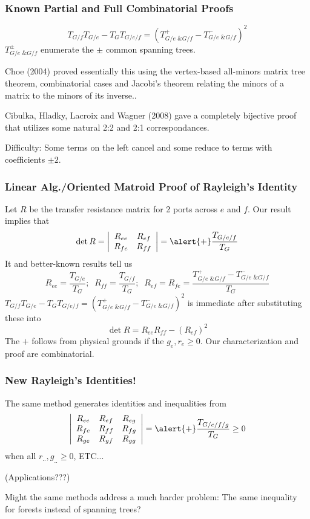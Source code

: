 \documentclass{article}
\newcommand{\Remph}[1]{{\color{red}#1}}
\begin{document}
\begin{frame}
\frametitle{Known Partial and Full Combinatorial Proofs}
\[
T_{G/f}T_{G/e} - T_GT_{G/e/f} = \left( T^+_{G/e \text{ \& } G/f} - T^-_{G/e \text{ \& } G/f} \right)^2
\]
$T^{\pm}_{G/e \text{ \& } G/f}$ enumerate the $\pm$ common spanning trees.

\vfill
Choe (2004) 
proved essentially this using the vertex-based all-minors matrix tree theorem,
combinatorial cases and Jacobi's theorem relating the minors of a matrix to
the minors of its inverse..

\vfill
Cibulka, Hladky, Lacroix and Wagner (2008) gave a completely bijective proof
that utilizes some natural 2:2 and 2:1 correspondances.

\vfill
\Remph{Difficulty:} Some terms on the left \Remph{cancel} and some
reduce to terms with coefficients $\pm 2$.
\vfill
\end{frame}



\begin{frame}
\frametitle{Linear Alg./Oriented Matroid Proof of Rayleigh's Identity}
Let $R$ be the transfer resistance matrix for 2 ports across $e$ and $f$.
Our result implies that
\[
\det R = \left|\begin{array}{cc} R_{ee} & R_{ef} \\ R_{fe} & R_{ff} \end{array}\right|
= \alert{+} \frac{T_{G/e/f}}{T_G}
\]
It and better-known results tell us
\[
R_{ee} = \frac{T_{G/e}}{T_G};\;\;R_{ff} = \frac{T_{G/f}}{T_G};\;\;
R_{ef}=R_{fe}=\frac{ T^+_{G/e \text{ \& } G/f} - T^-_{G/e \text{ \& } G/f} }{T_G}
\]
$T_{G/f}T_{G/e} - T_GT_{G/e/f} = \left( T^+_{G/e \text{ \& } G/f} - T^-_{G/e \text{ \& } G/f} \right)^2$
is immediate after substituting these into
\[
\det R = R_{ee}R_{ff}-(R_{ef})^2
\]
\alert{The $+$ follows from physical grounds if the $g_e, r_e \geq 0$.  Our
characterization and proof are combinatorial.}
\end{frame}

\begin{frame}
\frametitle{New Rayleigh's Identities!}

The same method generates identities and inequalities from
\[
\left|
\begin{array}{ccc} R_{ee} & R_{ef} & R_{eg} \\ 
                   R_{fe} & R_{ff} & R_{fg} \\
                   R_{ge} & R_{gf} & R_{gg}
\end{array}\right|
= \alert{+} \frac{T_{G/e/f/g}}{T_G} \ge 0
\]
when all $r_{..}, g_{..} \ge 0$, ETC...

\vfill

(Applications???)

\vfill

\Remph{Might the same methods address a much harder problem:
The same inequality for } forests \Remph{ instead of 
spanning trees?}

\vfill
\end{frame}
\end{document}
